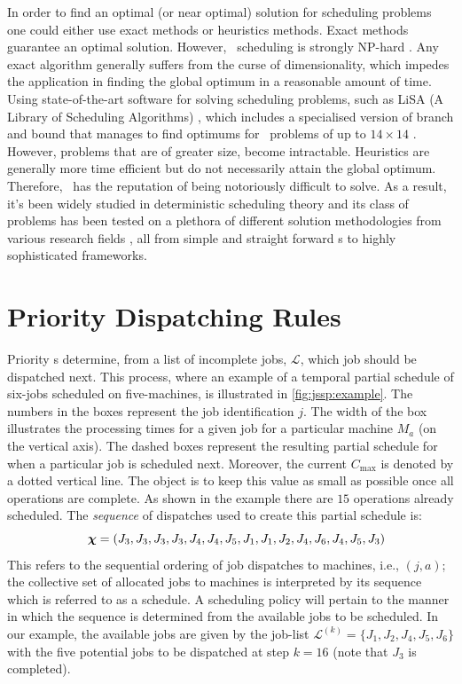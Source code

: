\documentclass[twocolumn]{svjour3}
\begin{document}
In order to find an optimal (or near optimal) solution for scheduling problems 
one could either use exact methods or heuristics methods. Exact methods 
guarantee an optimal solution. However, \jsp\ scheduling is strongly NP-hard 
\cite{Garey76:NPhard}. Any exact algorithm generally suffers from the curse of 
dimensionality, which impedes the application in finding the global optimum in 
a reasonable amount of time. 
Using state-of-the-art software for solving scheduling problems, such as 
LiSA %
(A Library of Scheduling Algorithms) \cite{LiSA}, which includes a specialised 
version of branch and bound that manages to find optimums for \jsp\ problems of 
up to $14\times14$ \cite{Ru12}. However, problems that are of greater size, 
become intractable. 
Heuristics are generally more time efficient but 
do not necessarily attain the global optimum. Therefore, \jsp\ has the 
reputation of being notoriously difficult to solve. 
As a result, it's been widely studied in deterministic scheduling theory and 
its class of problems has been tested on a plethora of different solution 
methodologies from various research fields \cite{Meeran12}, all from simple and 
straight forward \dr s to highly sophisticated frameworks.

\section{Priority Dispatching Rules} \label{sec:DR}

Priority \dr s determine, from a list of incomplete jobs, 
$\mathcal{L}$, which job should be dispatched next. This process, where an 
example of 
a temporal partial schedule of six-jobs scheduled on five-machines, is 
illustrated in \cref{fig:jssp:example}.
The numbers in the boxes represent the job identification $j$. 
The width of the box illustrates the processing times for a given job for a 
particular machine $M_a$ (on the vertical axis). 
The dashed boxes represent the resulting partial schedule for when a particular 
job is scheduled next. 
Moreover, the current $C_{\max}$ is denoted by a dotted vertical line. 
The object is to keep this value as small as possible once all operations are 
complete. As shown in the example there are $15$ operations already scheduled. 
The \textit{sequence} of dispatches used to create this partial schedule is:
\begin{equation}\quad
\bm \chi=\left(J_3,J_3,J_3,J_3,J_4,J_4,J_5,J_1,J_1,J_2,J_4,J_6,J_4,J_5,J_3\right)
\end{equation}
This refers to the sequential ordering of job dispatches to machines, i.e., 
$(j,a)$; 
the collective set of allocated jobs to machines is interpreted by its 
sequence which is referred to as a schedule.
A scheduling policy will pertain to the manner in which 
the sequence is determined from the available jobs to be scheduled. 
In our example, the available jobs are given by the job-list
$\mathcal{L}^{(k)}=\{J_1,J_2,J_4,J_5,J_6\}$ with the five potential jobs 
to be dispatched at step $k=16$ (note that $J_3$ is completed).
\end{document}
